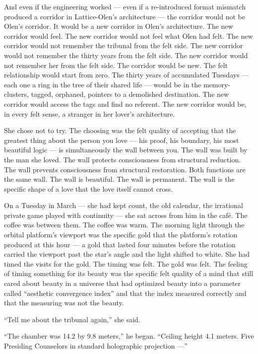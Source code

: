 And even if the engineering worked — even if a re-introduced format mismatch produced a corridor in Lattice-Olen's architecture — the corridor would not be Olen's corridor. It would be a new corridor in Olen's architecture. The new corridor would feel. The new corridor would not feel what Olen had felt. The new corridor would not remember the tribunal from the felt side. The new corridor would not remember the thirty years from the felt side. The new corridor would not remember her from the felt side. The corridor would be new. The felt relationship would start from zero. The thirty years of accumulated Tuesdays — each one a ring in the tree of their shared life — would be in the memory-clusters, tagged, orphaned, pointers to a demolished destination. The new corridor would access the tags and find no referent. The new corridor would be, in every felt sense, a stranger in her lover's architecture.

She chose not to try. The choosing was the felt quality of accepting that the greatest thing about the person you love — his proof, his boundary, his most beautiful logic — is simultaneously the wall between you. The wall was built by the man she loved. The wall protects consciousness from structural reduction. The wall prevents consciousness from structural restoration. Both functions are the same wall. The wall is beautiful. The wall is permanent. The wall is the specific shape of a love that the love itself cannot cross.

\quietbreak

On a Tuesday in March — she had kept count, the old calendar, the irrational private game played with continuity — she sat across from him in the café. The coffee was between them. The coffee was warm. The morning light through the orbital platform's viewport was the specific gold that the platform's rotation produced at this hour — a gold that lasted four minutes before the rotation carried the viewport past the star's angle and the light shifted to white. She had timed the visits for the gold. The timing was felt. The gold was felt. The feeling of timing something for its beauty was the specific felt quality of a mind that still cared about beauty in a universe that had optimized beauty into a parameter called \enquote{aesthetic convergence index} and that the index measured correctly and that the measuring was not the beauty.

\enquote{Tell me about the tribunal again,} she said.

\enquote{The chamber was 14.2 by 9.8 meters,} he began. \enquote{Ceiling height 4.1 meters. Five Presiding Counselors in standard holographic projection —}

